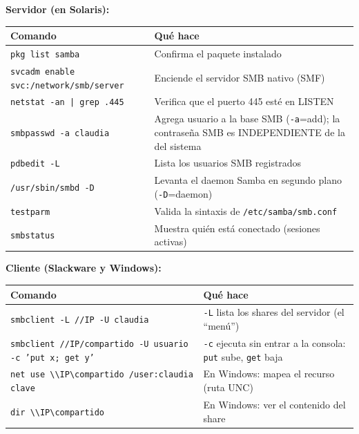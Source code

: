 \textbf{Servidor (en Solaris):}

\begin{center}
\begin{tabularx}{\textwidth}{lX}
  \toprule
  \textbf{Comando} & \textbf{Qué hace} \\
  \midrule
  \texttt{pkg list samba} & Confirma el paquete instalado \\
  \texttt{svcadm enable svc:/network/smb/server} & Enciende el servidor SMB nativo (SMF) \\
  \texttt{netstat -an | grep .445} & Verifica que el puerto 445 esté en LISTEN \\
  \texttt{smbpasswd -a claudia} & Agrega usuario a la base SMB (\texttt{-a}=add); la contraseña SMB es INDEPENDIENTE de la del sistema \\
  \texttt{pdbedit -L} & Lista los usuarios SMB registrados \\
  \texttt{/usr/sbin/smbd -D} & Levanta el daemon Samba en segundo plano (\texttt{-D}=daemon) \\
  \texttt{testparm} & Valida la sintaxis de \texttt{/etc/samba/smb.conf} \\
  \texttt{smbstatus} & Muestra quién está conectado (sesiones activas) \\
  \bottomrule
\end{tabularx}
\end{center}

\textbf{Cliente (Slackware y Windows):}

\begin{center}
\begin{tabularx}{\textwidth}{lX}
  \toprule
  \textbf{Comando} & \textbf{Qué hace} \\
  \midrule
  \texttt{smbclient -L //IP -U claudia} & \texttt{-L} lista los shares del servidor (el ``menú'') \\
  \texttt{smbclient //IP/compartido -U usuario -c 'put x; get y'} & \texttt{-c} ejecuta sin entrar a la consola: \texttt{put} sube, \texttt{get} baja \\
  \texttt{net use \textbackslash\textbackslash IP\textbackslash compartido /user:claudia clave} & En Windows: mapea el recurso (ruta UNC) \\
  \texttt{dir \textbackslash\textbackslash IP\textbackslash compartido} & En Windows: ver el contenido del share \\
  \bottomrule
\end{tabularx}
\end{center}

